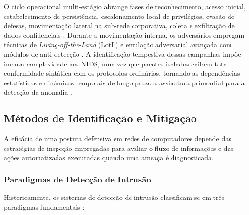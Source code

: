 \begin{enumerate}
    O ciclo operacional multi-estágio abrange fases de reconhecimento, acesso inicial, estabelecimento de persistência, escalonamento local de privilégios, evasão de defesas, movimentação lateral na sub-rede corporativa, coleta e exfiltração de dados confidenciais \cite{deepstage2026, laccolith2024}. Durante a movimentação interna, os adversários empregam técnicas de \emph{Living-off-the-Land} (LotL) e emulação adversarial avançada com módulos de anti-detecção \cite{laccolith2024}. A identificação tempestiva dessas campanhas impõe imensa complexidade aos NIDS, uma vez que pacotes isolados exibem total conformidade sintática com os protocolos ordinários, tornando as dependências estatísticas e dinâmicas temporais de longo prazo a assinatura primordial para a detecção da anomalia \cite{stix2026}.
\end{enumerate}

\subsection{Métodos de Identificação e Mitigação}
\label{subsec:metodos_identificacao_mitigacao}

A eficácia de uma postura defensiva em redes de computadores depende das estratégias de inspeção empregadas para avaliar o fluxo de informações e das ações automatizadas executadas quando uma ameaça é diagnosticada.

\subsubsection{Paradigmas de Detecção de Intrusão}

Historicamente, os sistemas de detecção de intrusão classificam-se em três paradigmas fundamentais \cite{advancedids2024}:

